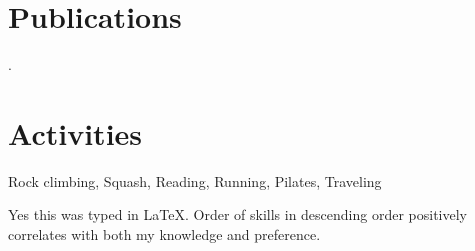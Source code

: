 \documentclass[10pt]{article}
\begin{document}


\section*{Publications}
.

\section*{Activities}
\begin{description}
	\setlength\itemsep{0.05em}
	\item Rock climbing, Squash, Reading, Running, Pilates, Traveling
\end{description}


{\vfill
\scriptsize\hfill Yes this was typed in \LaTeX. Order of skills in descending order positively correlates with both my knowledge and preference.}

\end{document}
